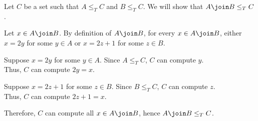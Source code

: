 \begin{problem}
\begin{answer}
\begin{enumarabic}
        \step
        Let $C$ be a set such that $A \leq_T C$ and $B \leq_T C$.
        We will show that $A \join B \leq_T C$.

        Let $x \in A \join B$.
        By definition of $A \join B$, for every $x \in A \join B$,
        either $x = 2y$ for some $y \in A$
        or $x = 2z+1$ for some $z \in B$.

        \begin{enumroman}
          \item Suppose $x = 2y$ for some $y \in A$.
            Since $A \leq_T C$, $C$ can compute $y$. \\
            Thus, $C$ can compute $2y = x$.
          \item Suppose $x = 2z+1$ for some $z \in B$.
            Since $B \leq_T C$, $C$ can compute $z$. \\
            Thus, $C$ can compute $2z + 1 = x$.
        \end{enumroman}
        
        Therefore, $C$ can compute all $x \in A \join B$,
        hence $A \join B \leq_T C$.
    \end{enumarabic}
  \end{answer}
\end{problem}
